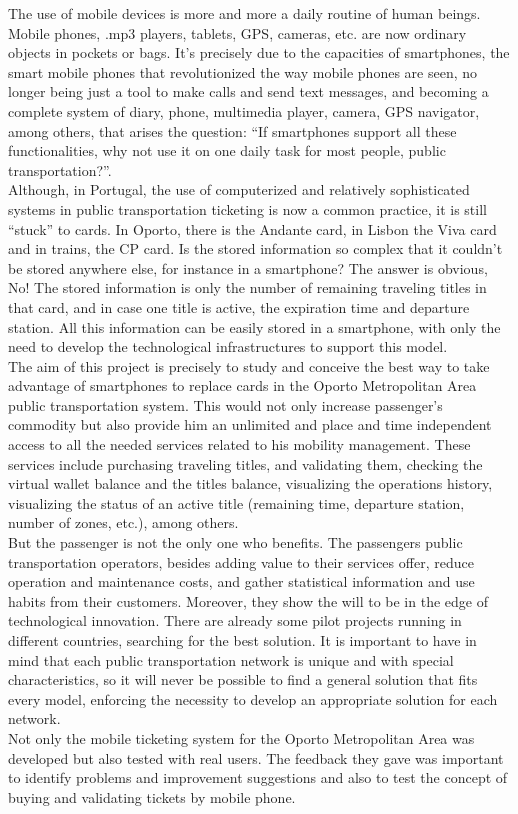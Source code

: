 The use of mobile devices is more and more a daily routine of human beings. Mobile phones, .mp3 players, tablets, GPS, cameras, etc. are now ordinary objects in pockets or bags. It's precisely due to the capacities of smartphones, the smart mobile phones that revolutionized the way mobile phones are seen, no longer being just a tool to make calls and send text messages, and becoming a complete system of diary, phone, multimedia player, camera, GPS navigator, among others, that arises the question: “If smartphones support all these functionalities, why not use it on one daily task for most people, public transportation?”.
\\Although, in Portugal, the use of computerized and relatively sophisticated systems in public transportation ticketing is now a common practice, it is still “stuck” to cards. In Oporto, there is the Andante card, in Lisbon the Viva card and in trains, the CP card. Is the stored information so complex that it couldn’t be stored anywhere else, for instance in a smartphone? The answer is obvious, No! The stored information is only the number of remaining traveling titles in that card, and in case one title is active, the expiration time and departure station. All this information can be easily stored in a smartphone, with only the need to develop the technological infrastructures to support this model.
\\The aim of this project is precisely to study and conceive the best way to take advantage of smartphones to replace cards in the Oporto Metropolitan Area public transportation system. This would not only increase passenger’s commodity but also provide him an unlimited and place and time independent access to all the needed services related to his mobility management. These services include purchasing traveling titles, and validating them, checking the virtual wallet balance and the titles balance, visualizing the operations history, visualizing the status of an active title (remaining time, departure station, number of zones, etc.), among others.
\\But the passenger is not the only one who benefits. The passengers public transportation operators, besides adding value to their services offer, reduce operation and maintenance costs, and gather statistical information and use habits from their customers. Moreover, they show the will to be in the edge of technological innovation. There are already some pilot projects running in different countries, searching for the best solution. It is important to have in mind that each public transportation network is unique and with special characteristics, so it will never be possible to find a general solution that fits every model, enforcing the necessity to develop an appropriate solution for each network.
\\Not only the mobile ticketing system for the Oporto Metropolitan Area was developed but also tested with real users. The feedback they gave was important to identify problems and improvement suggestions and also to test the concept of buying and validating tickets by mobile phone.